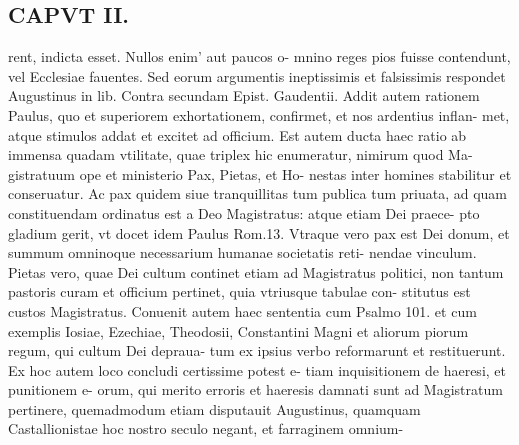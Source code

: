 \documentclass{article}
\begin{document}
\begin{pages}
\section*{CAPVT  II. }
\marginpar{[ p.49 ]}\pstart rent, indicta esset. Nullos enim' aut paucos o- mnino reges pios fuisse contendunt, vel Ecclesiae fauentes. Sed eorum argumentis ineptissimis et falsissimis respondet Augustinus in lib.  Contra secundam Epist. Gaudentii. Addit autem rationem Paulus, quo et superiorem exhortationem, confirmet, et nos ardentius inflan- met, atque stimulos addat et excitet ad officium. Est autem ducta haec ratio ab immensa quadam vtilitate, quae triplex hic enumeratur, nimirum quod Ma- gistratuum ope et ministerio Pax, Pietas, et Ho- nestas inter homines stabilitur et conseruatur. Ac pax quidem siue tranquillitas tum publica tum priuata, ad quam constituendam ordinatus est a Deo Magistratus: atque etiam Dei praece- pto gladium gerit, vt docet idem Paulus Rom.13. Vtraque vero pax est Dei donum, et summum omninoque necessarium humanae societatis reti- nendae vinculum. Pietas vero, quae Dei cultum continet etiam ad Magistratus politici, non tantum pastoris curam et officium pertinet, quia vtriusque tabulae con- stitutus est custos Magistratus. Conuenit autem haec sententia cum Psalmo 101. et cum exemplis Iosiae, Ezechiae, Theodosii, Constantini Magni et aliorum piorum regum, qui cultum Dei depraua- tum ex ipsius verbo reformarunt et restituerunt. Ex hoc autem loco concludi certissime potest e- tiam inquisitionem de haeresi, et punitionem e- orum, qui merito erroris et haeresis damnati sunt ad Magistratum pertinere, quemadmodum etiam disputauit Augustinus, quamquam Castallionistae hoc nostro seculo negant, et farraginem omnium-  \pend

\end{pages}
\end{document}
